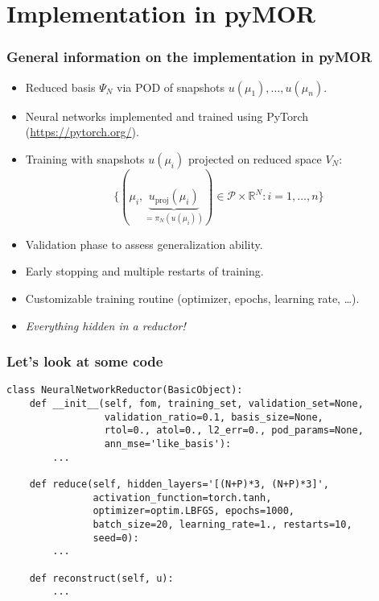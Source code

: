 \documentclass[%
]{beamer}
\begin{document}
\section{Implementation in pyMOR}
\begin{frame}[fragile]
	\frametitle{General information on the implementation in pyMOR}
	\begin{itemize}
		\item Reduced basis $\Psi_N$ via POD of snapshots $u(\mu_1),\dots,u(\mu_{n})$.
		\item Neural networks implemented and trained using PyTorch (\url{https://pytorch.org/}).
		\item Training with snapshots $u(\mu_i)$ projected on reduced space $V_N$:
		\[
			\{(\mu_i,\underbrace{u_{\mathrm{proj}}(\mu_i)}_{=\pi_N(u(\mu_i))})\in\mathcal{P}\times\mathbb{R}^N:i=1,\dots,n\}
		\]
		\item Validation phase to assess generalization ability.
		\item Early stopping and multiple restarts of training.
		\item Customizable training routine (optimizer, epochs, learning rate, \dots).
		\item \emph{Everything hidden in a reductor!}
	\end{itemize}
\end{frame}
\begin{frame}[fragile]
	\frametitle{Let's look at some code \textellipsis}
	\begin{verbatim}
class NeuralNetworkReductor(BasicObject):
    def __init__(self, fom, training_set, validation_set=None,
                 validation_ratio=0.1, basis_size=None,
                 rtol=0., atol=0., l2_err=0., pod_params=None,
                 ann_mse='like_basis'):
        ...

    def reduce(self, hidden_layers='[(N+P)*3, (N+P)*3]',
               activation_function=torch.tanh,
               optimizer=optim.LBFGS, epochs=1000,
               batch_size=20, learning_rate=1., restarts=10,
               seed=0):
        ...
                                
    def reconstruct(self, u):
        ...
	\end{verbatim}
\end{frame}
\end{document}
